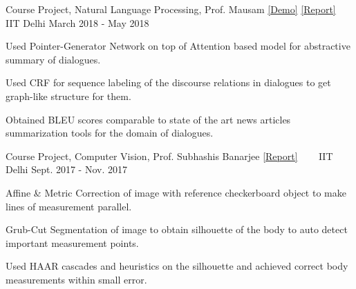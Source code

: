 \begin{cventries}
  \cventry
  {Course Project, Natural Language Processing, Prof. Mausam \href{http://www.cse.iitd.ac.in/nlpdemo/abst_dial}{[Demo]}
  \href{http://www.cse.iitd.ac.in/nlpdemo/abst_dial/report.pdf}{[Report]}
  }
  {\href{https://github.com/saketdingliwal/Abstractive-Dialogue-Summarization}{}
    \ \ \ \normalfont\href{https://github.com/saketdingliwal/Abstractive-Dialogue-Summarization}
    {}}
  {IIT Delhi}
  {March 2018 - May 2018}
  {
    \begin{cvitems}
    \item Used Pointer-Generator Network on top of Attention based model for abstractive summary of dialogues.
    \item Used CRF for sequence labeling of the discourse relations in dialogues to get graph-like structure for them.
    \item Obtained BLEU scores comparable to state of the art news articles summarization tools for the domain of dialogues.
    \end{cvitems}
  }
  
  \cventry
  {Course Project, Computer Vision, Prof. Subhashis Banarjee
  \href {https://github.com/ankesh007/Body-Measurement-using-Computer-Vision/blob/master/Presentation.pdf} {[Report]}}
  {\href{https://github.com/ankesh007/Body-Measurement-using-Computer-Vision}{}
    \ \ \ \normalfont\href{https://github.com/ankesh007/Body-Measurement-using-Computer-Vision}
    {}}
  {IIT Delhi}
  {Sept. 2017 - Nov. 2017}
  {
    \begin{cvitems}
    \item Affine \& Metric Correction of image with reference checkerboard object to make lines of measurement parallel.
    \item Grub-Cut Segmentation of image to obtain silhouette of the body to auto detect important measurement points.
    \item Used HAAR cascades and heuristics on the silhouette and achieved correct body measurements within small error.
    \end{cvitems}
  }



\end{cventries}
